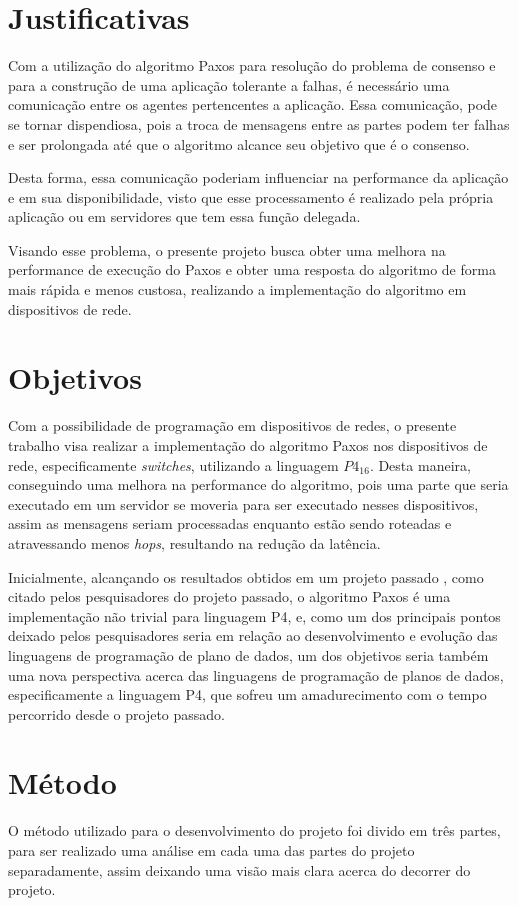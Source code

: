 \documentclass[12pt,
openright, 
oneside,
a4paper,
brazil]{facom-ufu-abntex2}
\theoremstyle{definition}
\begin{document}
\section{Justificativas}
Com a utilização do algoritmo Paxos para resolução do problema de consenso e para a 
construção de uma aplicação tolerante a falhas, é necessário uma comunicação entre os 
agentes pertencentes a aplicação. Essa comunicação, pode se tornar dispendiosa, pois 
a troca de mensagens entre as partes podem ter falhas e ser prolongada até que o 
algoritmo alcance seu objetivo que é o consenso.

Desta forma, essa comunicação poderiam influenciar na performance da aplicação e em 
sua disponibilidade, visto que esse processamento é realizado pela própria aplicação ou 
em servidores que tem essa função delegada.

Visando esse problema, o presente projeto busca obter uma melhora na performance de 
execução do Paxos e obter uma resposta do algoritmo de forma mais rápida e menos 
custosa, realizando a implementação do algoritmo em dispositivos de rede.

\section{Objetivos}
Com a possibilidade de programação em dispositivos de redes, o presente trabalho 
visa realizar a implementação do algoritmo Paxos nos dispositivos
de rede, especificamente \textit{switches}, utilizando a linguagem $P4_{16}$. 
Desta maneira, conseguindo uma melhora na performance do algoritmo, pois uma parte 
que seria executado em um servidor se moveria para ser executado nesses dispositivos, assim
as mensagens seriam processadas enquanto estão sendo roteadas e atravessando menos
\textit{hops}, resultando na redução da latência.

Inicialmente, alcançando os resultados obtidos em um projeto passado \citep{dang2016paxos},
como citado pelos pesquisadores do projeto passado, o algoritmo Paxos é uma implementação
não trivial para linguagem P4, e, como um dos principais pontos deixado pelos pesquisadores
seria em relação ao desenvolvimento e evolução das linguagens de programação de plano de dados,
um dos objetivos seria também uma nova perspectiva acerca das linguagens de programação de 
planos de dados, especificamente a linguagem P4, que sofreu um amadurecimento com o tempo 
percorrido desde o projeto passado.

\section{Método}
O método utilizado para o desenvolvimento do projeto foi divido em três partes, para
ser realizado uma análise em cada uma das partes do projeto separadamente, assim deixando uma
visão mais clara acerca do decorrer do projeto.
\end{document}
